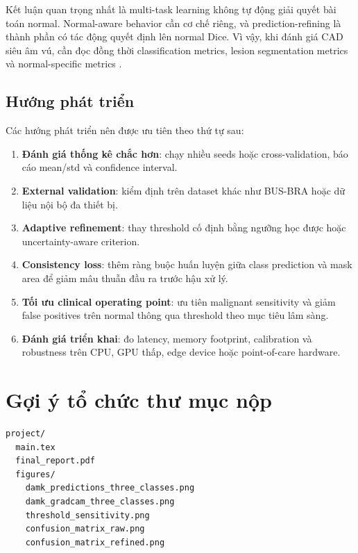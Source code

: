 \documentclass[12pt,a4paper,oneside]{report}
\begin{document}
Kết luận quan trọng nhất là multi-task learning không tự động giải quyết bài toán normal. Normal-aware behavior cần cơ chế riêng, và prediction-refining là thành phần có tác động quyết định lên normal Dice. Vì vậy, khi đánh giá CAD siêu âm vú, cần đọc đồng thời classification metrics, lesion segmentation metrics và normal-specific metrics \citep{aumente,damknet}.

\section{Hướng phát triển}

Các hướng phát triển nên được ưu tiên theo thứ tự sau:

\begin{enumerate}
  \item \textbf{Đánh giá thống kê chắc hơn}: chạy nhiều seeds hoặc cross-validation, báo cáo mean/std và confidence interval.
  \item \textbf{External validation}: kiểm định trên dataset khác như BUS-BRA hoặc dữ liệu nội bộ đa thiết bị.
  \item \textbf{Adaptive refinement}: thay threshold cố định bằng ngưỡng học được hoặc uncertainty-aware criterion.
  \item \textbf{Consistency loss}: thêm ràng buộc huấn luyện giữa class prediction và mask area để giảm mâu thuẫn đầu ra trước hậu xử lý.
  \item \textbf{Tối ưu clinical operating point}: ưu tiên malignant sensitivity và giảm false positives trên normal thông qua threshold theo mục tiêu lâm sàng.
  \item \textbf{Đánh giá triển khai}: đo latency, memory footprint, calibration và robustness trên CPU, GPU thấp, edge device hoặc point-of-care hardware.
\end{enumerate}

\appendix
\chapter{Gợi ý tổ chức thư mục nộp}

\begin{verbatim}
project/
  main.tex
  final_report.pdf
  figures/
    damk_predictions_three_classes.png
    damk_gradcam_three_classes.png
    threshold_sensitivity.png
    confusion_matrix_raw.png
    confusion_matrix_refined.png
\end{verbatim}
\end{document}
